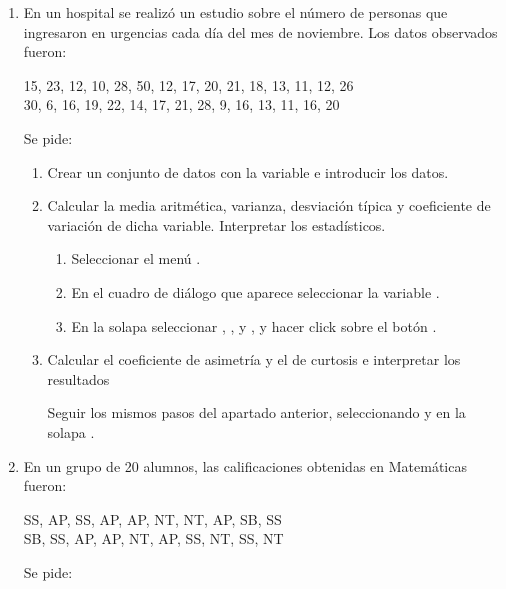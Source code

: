 \begin{enumerate}[leftmargin=*]
\item En un hospital se realizó un estudio sobre el número de personas que ingresaron en urgencias cada día del mes de
noviembre. 
Los datos observados fueron:
\begin{center}
15, 23, 12, 10, 28, 50, 12, 17, 20, 21, 18, 13, 11, 12, 26 \\
30, 6, 16, 19, 22, 14, 17, 21, 28, 9, 16, 13, 11, 16, 20
\end{center}
Se pide:

\begin{enumerate}
\item Crear un conjunto de datos con la variable  e introducir los datos.

\item Calcular la media aritmética, varianza, desviación típica y coeficiente de variación de dicha variable.
Interpretar los estadísticos. 
\begin{indicacion}{
\begin{enumerate}
\item Seleccionar el menú .
\item En el cuadro de diálogo que aparece seleccionar la variable .
\item En la solapa  seleccionar , , 
 y , y hacer click sobre el botón .
\end{enumerate}}
\end{indicacion}

\item Calcular el coeficiente de asimetría y el de curtosis e interpretar los resultados
\begin{indicacion}{
Seguir los mismos pasos del apartado anterior, seleccionando  y  en la solapa .}
\end{indicacion}
\end{enumerate}


\item En un grupo de 20 alumnos, las calificaciones obtenidas en Matemáticas fueron:
\begin{center}
SS, AP, SS, AP, AP, NT, NT, AP, SB, SS \\
SB, SS, AP, AP, NT, AP, SS, NT, SS, NT
\end{center}
Se pide:


\end{enumerate}
